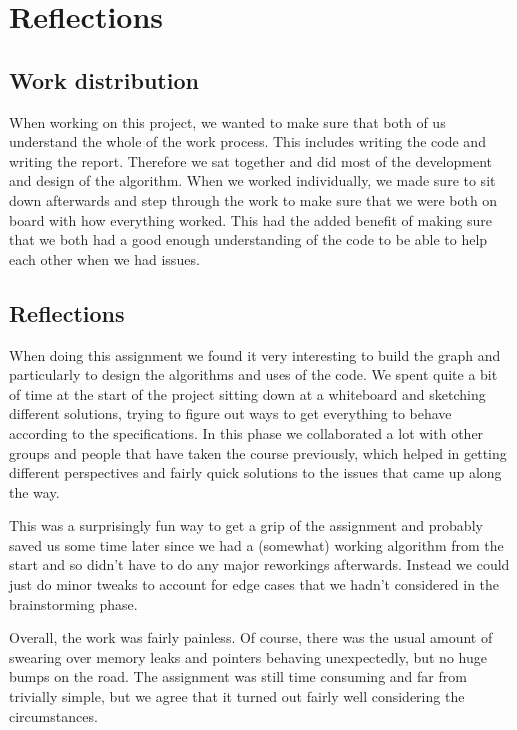 \documentclass{article}
\begin{document}
\section{Reflections}
\label{sec:orgd37f281}
\subsection{Work distribution}
\label{sec:org66520d9}
When working on this project, we wanted to make sure that both of us understand the whole of the work process. This includes writing the code and writing the report. Therefore we sat together and did most of the development and design of the algorithm. When we worked individually, we made sure to sit down afterwards and step through the work to make sure that we were both on board with how everything worked. This had the added benefit of making sure that we both had a good enough understanding of the code to be able to help each other when we had issues. 



\subsection{Reflections}
\label{sec:org2c6da4f}
When doing this assignment we found it very interesting to build the graph and particularly to design the algorithms and uses of the code. We spent quite a bit of time at the start of the project sitting down at a whiteboard and sketching different solutions, trying to figure out ways to get everything to behave according to the specifications. In this phase we collaborated a lot with other groups and people that have taken the course previously, which helped in getting different perspectives and fairly quick solutions to the issues that came up along the way. 

This was a surprisingly fun way to get a grip of the assignment and probably saved us some time later since we had a (somewhat) working algorithm from the start and so didn't have to do any major reworkings afterwards. Instead we could just do minor tweaks to account for edge cases that we hadn't considered in the brainstorming phase. 

Overall, the work was fairly painless. Of course, there was the usual amount of swearing over memory leaks and pointers behaving unexpectedly, but no huge bumps on the road. The assignment  was still time consuming and far from trivially simple, but we agree that it turned out fairly well considering the circumstances. 
\end{document}
